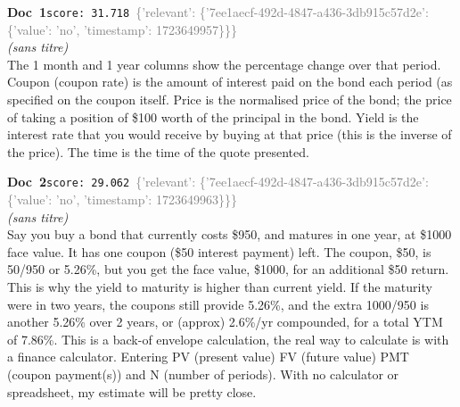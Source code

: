 \documentclass[a4paper,11pt]{article}
\begin{document}
\begin{docenv}
{\footnotesize\textcolor{doccolor}{\textbf{Doc~1}}}\hfill{\tiny\texttt{score:~31.718}}\ {\tiny\textcolor{gray}{\{'relevant': \{'7ee1aecf-492d-4847-a436-3db915c57d2e': \{'value': 'no', 'timestamp': 1723649957\}\}\}}}\\[3pt]
{\small\textit{(sans titre)}}\\[2pt]
\vspace{2pt}
{\footnotesize 
The 1 month and 1 year columns show the percentage change over that period. Coupon (coupon rate) is the amount of interest paid on the bond each period (as specified on the coupon itself. Price is the normalised price of the bond; the price of taking a position of \$100 worth of the principal in the bond. Yield is the interest rate that you would receive by buying at that price (this is the inverse of the price). The time is the time of the quote presented.}
\end{docenv}
\begin{docenv}
{\footnotesize\textcolor{doccolor}{\textbf{Doc~2}}}\hfill{\tiny\texttt{score:~29.062}}\ {\tiny\textcolor{gray}{\{'relevant': \{'7ee1aecf-492d-4847-a436-3db915c57d2e': \{'value': 'no', 'timestamp': 1723649963\}\}\}}}\\[3pt]
{\small\textit{(sans titre)}}\\[2pt]
\vspace{2pt}
{\footnotesize 
Say you buy a bond that currently costs \$950, and matures in one year, at \$1000 face value. It has one coupon (\$50 interest payment) left. The coupon, \$50, is 50/950 or 5.26\%, but you get the face value, \$1000, for an additional \$50 return. This is why the yield to maturity is higher than current yield. If the maturity were in two years, the coupons still provide 5.26\%, and the extra 1000/950 is another 5.26\% over 2 years, or (approx) 2.6\%/yr compounded, for a total YTM of 7.86\%. This is a back-of envelope calculation, the real way to calculate is with a finance calculator. Entering PV (present value) FV (future value) PMT (coupon payment(s)) and N (number of periods). With no calculator or spreadsheet, my estimate will be pretty close.}
\end{docenv}
\end{document}
